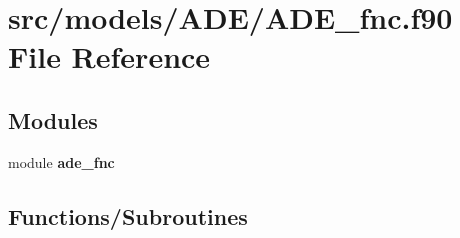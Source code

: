 \section{src/models/\+A\+D\+E/\+A\+D\+E\+\_\+fnc.f90 File Reference}
\label{_a_d_e__fnc_8f90}
\subsection*{Modules}
\begin{DoxyCompactItemize}
\item 
module {\bf ade\+\_\+fnc}
\end{DoxyCompactItemize}
\subsection*{Functions/\+Subroutines}
